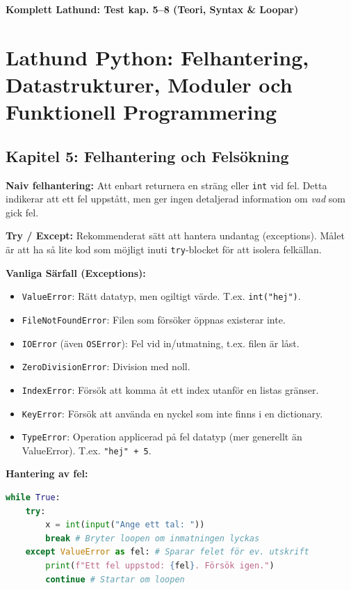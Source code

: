 \documentclass{article}
\begin{document}
\begin{center}
\Large\textbf{Komplett Lathund: Test kap. 5--8 (Teori, Syntax \& Loopar)}
\end{center}

\bigskip

\section*{Lathund Python: Felhantering, Datastrukturer, Moduler och Funktionell Programmering}

\subsection*{Kapitel 5: Felhantering och Felsökning}

\textbf{Naiv felhantering:} Att enbart returnera en sträng eller \texttt{int} vid fel. Detta indikerar att ett fel uppstått, men ger ingen detaljerad information om \textit{vad} som gick fel.

\textbf{Try / Except:} Rekommenderat sätt att hantera undantag (exceptions). Målet är att ha så lite kod som möjligt inuti \texttt{try}-blocket för att isolera felkällan.

\textbf{Vanliga Särfall (Exceptions):}
\begin{itemize}
    \item \texttt{ValueError}: Rätt datatyp, men ogiltigt värde. T.ex. \texttt{int("hej")}.
    \item \texttt{FileNotFoundError}: Filen som försöker öppnas existerar inte.
    \item \texttt{IOError} (även \texttt{OSError}): Fel vid in/utmatning, t.ex. filen är låst.
    \item \texttt{ZeroDivisionError}: Division med noll.
    \item \texttt{IndexError}: Försök att komma åt ett index utanför en listas gränser.
    \item \texttt{KeyError}: Försök att använda en nyckel som inte finns i en dictionary.
    \item \texttt{TypeError}: Operation applicerad på fel datatyp (mer generellt än ValueError). T.ex. \texttt{"hej" + 5}.
\end{itemize}

\textbf{Hantering av fel:}
\begin{lstlisting}[language=Python]
while True:
    try:
        x = int(input("Ange ett tal: "))
        break # Bryter loopen om inmatningen lyckas
    except ValueError as fel: # Sparar felet för ev. utskrift
        print(f"Ett fel uppstod: {fel}. Försök igen.")
        continue # Startar om loopen
\end{lstlisting}
\end{document}
